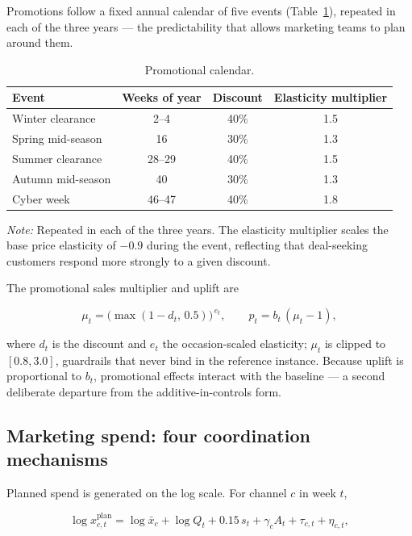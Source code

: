 \documentclass[
  conference]{IEEEtran}
\begin{document}
Promotions follow a fixed annual calendar of five events
(Table~\ref{tbl:calendar}), repeated in each of the three years --- the
predictability that allows marketing teams to plan around them.

\begin{table}[!htbp]
\centering
\footnotesize
\caption{Promotional calendar.}\label{tbl:calendar}
\begin{tabular}{@{}lccc@{}}
\toprule
Event & Weeks of year & Discount & Elasticity multiplier \\
\midrule
Winter clearance & 2–4 & 40\% & 1.5 \\
Spring mid-season & 16 & 30\% & 1.3 \\
Summer clearance & 28–29 & 40\% & 1.5 \\
Autumn mid-season & 40 & 30\% & 1.3 \\
Cyber week & 46–47 & 40\% & 1.8 \\
\bottomrule
\end{tabular}
\par\vspace{0.8em}
\begin{minipage}{\columnwidth}
\footnotesize
\textit{Note:} Repeated in each of the three years. The elasticity multiplier scales the base price elasticity of $-0.9$ during the event, reflecting that deal-seeking customers respond more strongly to a given discount.
\end{minipage}
\end{table}

The promotional sales multiplier and uplift are

\[\mu_t = \big(\max(1 - d_t,\, 0.5)\big)^{\,e_t}, \qquad p_t = b_t\,(\mu_t - 1), \tag{3}\]

where \(d_t\) is the discount and \(e_t\) the occasion-scaled
elasticity; \(\mu_t\) is clipped to \([0.8, 3.0]\), guardrails that
never bind in the reference instance. Because uplift is proportional to
\(b_t\), promotional effects interact with the baseline --- a second
deliberate departure from the additive-in-controls form.

\subsection{Marketing spend: four coordination
mechanisms}\label{marketing-spend-four-coordination-mechanisms}

Planned spend is generated on the log scale. For channel \(c\) in week
\(t\),

\[\log x^{\text{plan}}_{c,t} = \log \bar{x}_c + \log Q_t + 0.15\, s_t + \gamma_c A_t + \tau_{c,t} + \eta_{c,t}, \tag{4}\]
\end{document}
